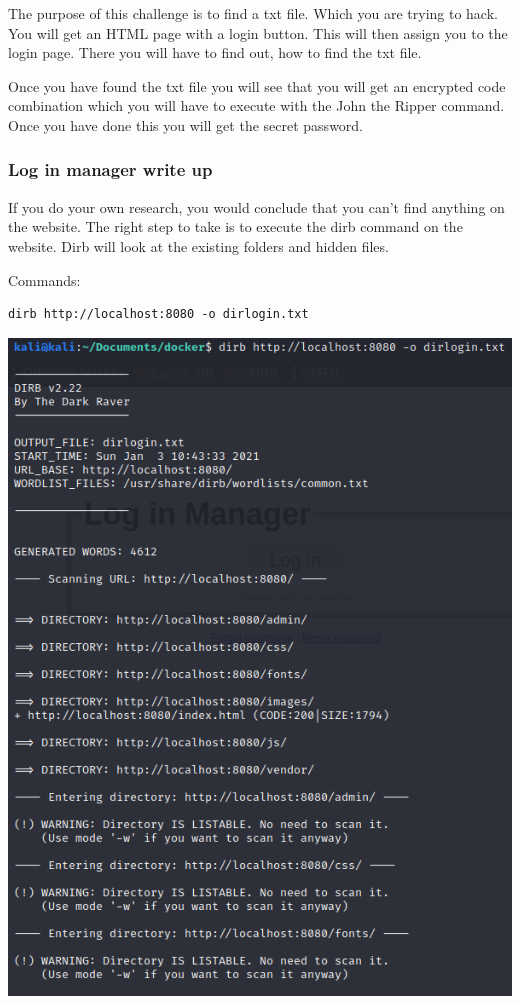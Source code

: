 \documentclass[../main.tex]{subfiles}
\begin{document}
The purpose of this challenge is to find a txt file. Which you are trying to hack. You will get an HTML page with a login button. This will then assign you to the login page. There you will have to find out, how to find the txt file. 

Once you have found the txt file you will see that you will get an encrypted code combination which you will have to execute with the John the Ripper command. Once you have done this you will get the secret password. 

\subsubsection{Log in manager write up}

If you do your own research, you would conclude that you can't find anything on the website. The right step to take is to execute the dirb command on the website. Dirb will look at the existing folders and hidden files. 

Commands:
\begin{lstlisting}
dirb http://localhost:8080 -o dirlogin.txt
\end{lstlisting}
\includegraphics[width=\linewidth]{images/Boyan/challenge2_1_boyan.PNG}
\end{document}
